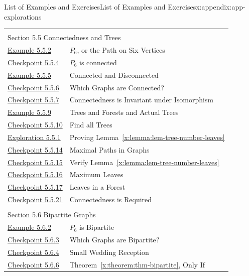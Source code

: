\documentclass[oneside,10pt,]{book}
\newcommand{\xreffont}{\relax}
\numberwithin{equation}{section}
\begin{document}
\begin{appendixptx}{List of Examples and Exercises}{}{List of Examples and Exercises}{}{}{x:appendix:app-explorations}
\begin{longtable}[l]{ll}
\multicolumn{2}{l}{\null}\\[1.5ex] \multicolumn{2}{l}{\large Section 5.5 Connectedness and Trees}\\[0.5ex]
\hyperref[x:example:eg-path-graph]{Example 5.5.2}& \(P_6\), or the Path on Six Vertices\\
\hyperref[x:exercise:ex-path-connected]{Checkpoint 5.5.4}& \(P_6\) is connected\\
\hyperref[x:example:eg-graph-connected-component]{Example 5.5.5}& Connected and Disconnected\\
\hyperref[x:exercise:ex-which-connected]{Checkpoint 5.5.6}& Which Graphs are Connected?\\
\hyperref[x:exercise:ex-isomorphic-connected]{Checkpoint 5.5.7}& Connectedness is Invariant under Isomorphism\\
\hyperref[x:example:eg-tree-forest]{Example 5.5.9}& Trees and Forests and Actual Trees\\
\hyperref[x:exercise:ex-nonisomorphic-trees]{Checkpoint 5.5.10}& Find all Trees\\
\hyperref[x:exploration:expl-tree-number-leaves]{Exploration 5.5.1}& Proving Lemma~{\xreffont\ref*{x:lemma:lem-tree-number-leaves}}\\
\hyperref[x:exercise:ex-maximal-paths]{Checkpoint 5.5.14}& Maximal Paths in Graphs\\
\hyperref[x:exercise:ex-verify-lemma-leaves]{Checkpoint 5.5.15}& Verify Lemma~{\xreffont\ref*{x:lemma:lem-tree-number-leaves}}\\
\hyperref[x:exercise:ex-max-leaves]{Checkpoint 5.5.16}& Maximum Leaves\\
\hyperref[x:exercise:ex-min-max-leaves-forest]{Checkpoint 5.5.17}& Leaves in a Forest\\
\hyperref[x:exercise:ex-not-a-tree]{Checkpoint 5.5.21}& Connectedness is Required\\
\multicolumn{2}{l}{\null}\\[1.5ex] \multicolumn{2}{l}{\large Section 5.6 Bipartite Graphs}\\[0.5ex]
\hyperref[x:example:eg-bipartite]{Example 5.6.2}& \(P_6\) is Bipartite\\
\hyperref[x:exercise:ex-which-bipartite]{Checkpoint 5.6.3}& Which Graphs are Bipartite?\\
\hyperref[x:exercise:ex-explain-g8-bipartite]{Checkpoint 5.6.4}& Small Wedding Reception\\
\hyperref[x:exercise:ex-bipartite-only-if]{Checkpoint 5.6.6}& Theorem~{\xreffont\ref*{x:theorem:thm-bipartite}}, Only If\\

\end{longtable}
\end{appendixptx}
\end{document}
